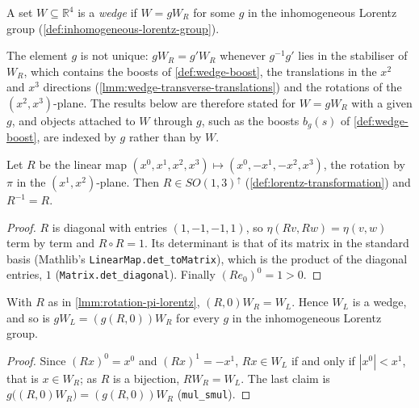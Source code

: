 \begin{definition}[Wedge]
    \label{def:wedge}
    \leanok
    A set $W \subseteq \mathbb{R}^4$ is a \emph{wedge} if $W = gW_R$ for some $g$ in the inhomogeneous Lorentz group (\ref{def:inhomogeneous-lorentz-group}).

    The element $g$ is not unique: $gW_R = g'W_R$ whenever $g^{-1}g'$ lies in the stabiliser of $W_R$, which contains the boosts of \ref{def:wedge-boost}, the translations in the $x^2$ and $x^3$ directions (\ref{lmm:wedge-transverse-translations}) and the rotations of the $(x^2, x^3)$-plane. The results below are therefore stated for $W = gW_R$ with a given $g$, and objects attached to $W$ through $g$, such as the boosts $b_g(s)$ of \ref{def:wedge-boost}, are indexed by $g$ rather than by $W$.
\end{definition}

\begin{lemma}
    \label{lmm:rotation-pi-lorentz}
    \leanok
    Let $R$ be the linear map $(x^0, x^1, x^2, x^3) \mapsto (x^0, -x^1, -x^2, x^3)$, the rotation by $\pi$ in the $(x^1, x^2)$-plane. Then $R \in SO(1,3)^{\uparrow}$ (\ref{def:lorentz-transformation}) and $R^{-1} = R$.
\end{lemma}
\begin{proof}
    \leanok
    $R$ is diagonal with entries $(1, -1, -1, 1)$, so $\eta(Rv, Rw) = \eta(v, w)$ term by term and $R \circ R = 1$. Its determinant is that of its matrix in the standard basis (Mathlib's \texttt{LinearMap.det\_toMatrix}), which is the product of the diagonal entries, $1$ (\texttt{Matrix.det\_diagonal}). Finally $(Re_0)^0 = 1 > 0$.
\end{proof}

\begin{lemma}
    \label{lmm:left-wedge-is-wedge}
    \leanok
    With $R$ as in \ref{lmm:rotation-pi-lorentz}, $(R, 0)W_R = W_L$. Hence $W_L$ is a wedge, and so is $gW_L = (g(R,0))W_R$ for every $g$ in the inhomogeneous Lorentz group.
\end{lemma}
\begin{proof}
    \leanok
    Since $(Rx)^0 = x^0$ and $(Rx)^1 = -x^1$, $Rx \in W_L$ if and only if $|x^0| < x^1$, that is $x \in W_R$; as $R$ is a bijection, $RW_R = W_L$. The last claim is $g\big((R,0)W_R\big) = (g(R,0))W_R$ (\texttt{mul\_smul}).
\end{proof}

